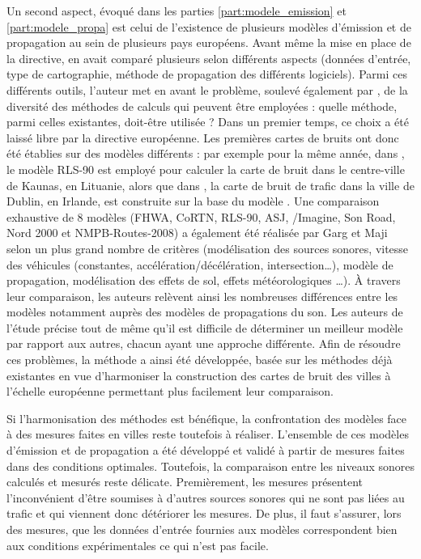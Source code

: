 Un second aspect, évoqué dans les parties \ref{part:modele_emission} et \ref{part:modele_propa} est celui de l'existence de plusieurs modèles d'émission et de propagation au sein de plusieurs pays européens. Avant même la mise en place de la directive, \cite{steele_critical_2001} en avait comparé plusieurs selon différents aspects (données d'entrée, type de cartographie, méthode de propagation des différents logiciels).
Parmi ces différents outils, l'auteur met en avant le problème, soulevé également par \cite{king_implementation_2011}, de la diversité des méthodes de calculs qui peuvent être employées : quelle méthode, parmi celles existantes, doit-être utilisée ?
Dans un premier temps, ce choix a été laissé libre par la directive européenne. Les premières cartes de bruits ont donc été établies sur des modèles différents : par exemple pour la même année, dans \cite{kliuvcininkas2006noise}, le modèle RLS-90 est employé pour calculer la carte de bruit dans le centre-ville de Kaunas, en Lituanie,  alors que dans \cite{murphy_environmental_2006}, la carte de bruit de trafic dans la ville de Dublin, en Irlande, est construite sur la base du modèle .
Une comparaison exhaustive de 8 modèles (FHWA, CoRTN, RLS-90, ASJ, /Imagine, Son Road, Nord 2000 et NMPB-Routes-2008) a également été réalisée par Garg et Maji \cite{garg_critical_2014} selon un plus grand nombre de critères (modélisation des sources sonores, vitesse des véhicules (constantes, accélération/décélération, intersection\dots), modèle de propagation, modélisation des effets de sol, effets météorologiques \dots). À travers leur comparaison, les auteurs relèvent ainsi les nombreuses différences entre les modèles notamment auprès des modèles de propagations du son. Les auteurs de l'étude précise tout de même qu'il est difficile de déterminer un \og meilleur \fg{} modèle par rapport aux autres, chacun ayant une approche différente.
Afin de résoudre ces problèmes, la méthode  \cite{CNOSSOS,kephalopoulos} a ainsi été développée, basée sur les méthodes déjà existantes en vue d'harmoniser la construction des cartes de bruit des villes à l'échelle européenne permettant plus facilement leur comparaison.

Si l'harmonisation des méthodes est bénéfique, la confrontation des modèles face à des mesures faites en villes reste toutefois à réaliser. L'ensemble de ces modèles d'émission et de propagation a été développé et validé à partir de mesures faites dans des conditions optimales. Toutefois, la comparaison entre les niveaux sonores calculés et mesurés reste délicate. Premièrement, les mesures présentent l'inconvénient d'être soumises à d'autres sources sonores qui ne sont pas liées au trafic et qui viennent donc détériorer les mesures. De plus, il faut s'assurer, lors des mesures, que les données d'entrée fournies aux modèles correspondent bien aux conditions expérimentales ce qui n'est pas facile.

